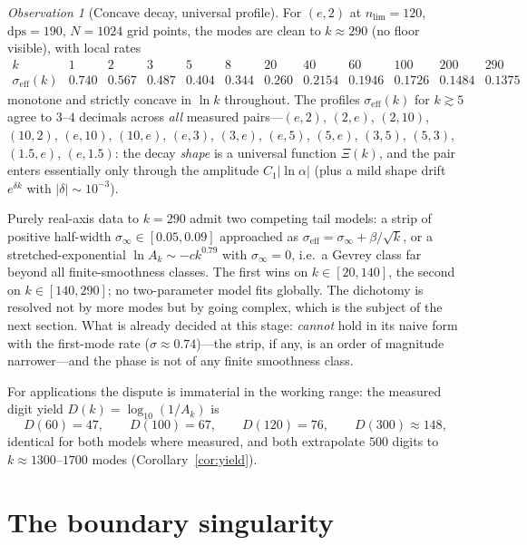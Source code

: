 \documentclass[11pt,a4paper]{article}
\theoremstyle{definition}
\theoremstyle{remark}
\newtheorem{observation}[theorem]{Observation}
\newcommand{\eff}{\mathrm{eff}}
\begin{document}
\begin{observation}[Concave decay, universal profile]\label{obs:decay}
For $(e,2)$ at $n_{\mathrm{lim}}=120$, $\mathrm{dps}=190$, $N=1024$ grid points, the modes are
clean to $k\approx290$ (no floor visible), with local rates
\[
\begin{array}{c|ccccccccccc}
k & 1 & 2 & 3 & 5 & 8 & 20 & 40 & 60 & 100 & 200 & 290\\\hline
\sigma_\eff(k) & 0.740 & 0.567 & 0.487 & 0.404 & 0.344 & 0.260 & 0.2154 & 0.1946 & 0.1726 &
0.1484 & 0.1375
\end{array}
\]
monotone and strictly concave in $\ln k$ throughout. The profiles $\sigma_\eff(k)$ for
$k\gtrsim5$ agree to $3$--$4$ decimals across \emph{all} measured pairs---$(e,2)$, $(2,e)$,
$(2,10)$, $(10,2)$, $(e,10)$, $(10,e)$, $(e,3)$, $(3,e)$, $(e,5)$, $(5,e)$, $(3,5)$, $(5,3)$,
$(1.5,e)$, $(e,1.5)$: the decay \emph{shape} is a universal function $\Xi(k)$, and the pair
enters essentially only through the amplitude $C_1\lvert\ln\alpha\rvert$ (plus a mild shape
drift $e^{\delta k}$ with $\lvert\delta\rvert\sim10^{-3}$).
\end{observation}

Purely real-axis data to $k=290$ admit two competing tail models: a strip of positive
half-width $\sigma_\infty\in[0.05,0.09]$ approached as $\sigma_\eff=\sigma_\infty+\beta/\sqrt
k$, or a stretched-exponential $\ln A_k\sim-ck^{0.79}$ with $\sigma_\infty=0$, i.e.\ a Gevrey
class far beyond all finite-smoothness classes. The first wins on $k\in[20,140]$, the second
on $k\in[140,290]$; no two-parameter model fits globally. The dichotomy is resolved not by
more modes but by going complex, which is the subject of the next section. What is already
decided at this stage: \cite[Conj.~8.1]{phaselaw} \emph{cannot} hold in its naive form with
the first-mode rate ($\sigma\approx0.74$)---the strip, if any, is an order of magnitude
narrower---and the phase is not of any finite smoothness class.

For applications the dispute is immaterial in the working range: the measured digit yield
$D(k)=\log_{10}(1/A_k)$ is
\[
D(60)=47,\qquad D(100)=67,\qquad D(120)=76,\qquad D(300)\approx148,
\]
identical for both models where measured, and both extrapolate $500$ digits to
$k\approx1300$--$1700$ modes (Corollary~\ref{cor:yield}).

\section{The boundary singularity}\label{sec:singularity}
\end{document}
